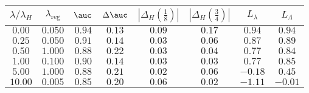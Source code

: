 \begin{tabular}{cccccccc} 
\toprule 
$\lambda / \lambda_H$ & $\lambda_\text{reg}$ & $\auc$ & $\Delta \auc$ 
& $|\Delta_H(\frac{1}{8})|$ & $|\Delta_H(\frac{3}{4})|$ & $L_\lambda$ & $L_\Lambda$ \\ 
\midrule 
$0.00$ & $0.050$ & $0.94$ & $0.13$ & $0.09$ & $0.17$ & $0.94$ & $0.94$ \\ 
$0.25$ & $0.050$ & $0.91$ & $0.14$ & $0.03$ & $0.06$ & $0.87$ & $0.89$ \\ 
$0.50$ & $1.000$ & $0.88$ & $0.22$ & $0.03$ & $0.04$ & $0.77$ & $0.84$ \\ 
$1.00$ & $0.100$ & $0.90$ & $0.14$ & $0.03$ & $0.03$ & $0.77$ & $0.85$ \\ 
$5.00$ & $1.000$ & $0.88$ & $0.21$ & $0.02$ & $0.06$ & $-0.18$ & $0.45$ \\ 
$10.00$ & $0.005$ & $0.85$ & $0.20$ & $0.06$ & $0.02$ & $-1.11$ & $-0.01$ \\ 
\bottomrule 
\end{tabular} 
